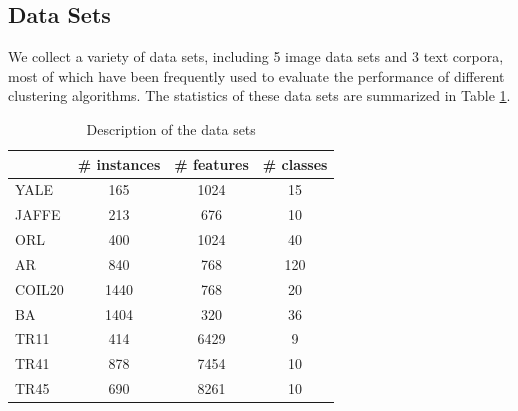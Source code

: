 \documentclass{article}
\begin{document}
\subsection{Data Sets}
We collect a variety of data sets, including 5 image data sets and 3 text corpora, most of which have been frequently used to evaluate the performance of different clustering algorithms. The statistics of these data sets are summarized in Table \ref{data}.

\begin{table}[h]
\centering
\caption{Description of the data sets}
\label{data}
\begin{tabular}{|l|c|c|c|}
\hline
&\textrm{\# instances}&\textrm{\# features}&\textrm{\# classes}\\\hline
\textrm{YALE}&165&1024&15\\\hline
\textrm{JAFFE}&213&676&10\\\hline
\textrm{ORL}&400&1024&40\\\hline
\textrm{AR}&840&768&120\\\hline
\textrm{COIL20}&1440&768&20\\\hline
\textrm{BA}&1404&320&36\\\hline
\textrm{TR11}&414&6429&9\\\hline
\textrm{TR41}&878&7454&10\\\hline
\textrm{TR45}&690&8261&10\\\hline
\end{tabular}
\end{table}
\end{document}
